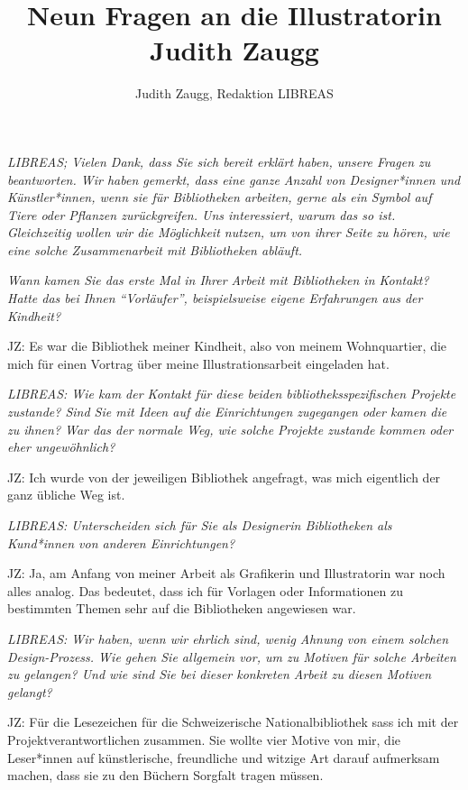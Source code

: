 \documentclass[a4paper,
fontsize=11pt,
oneside,
numbers=noperiodatend,
parskip=half-,
bibliography=totoc,
final
]{scrartcl}
\title{\LARGE{Neun Fragen an die Illustratorin Judith Zaugg}}%
\author{Judith Zaugg, Redaktion LIBREAS} %
\date{}
\begin{document}
\maketitle
\thispagestyle{fancyplain} 


\emph{LIBREAS; Vielen Dank, dass Sie sich bereit erklärt haben, unsere
Fragen zu beantworten. Wir haben gemerkt, dass eine ganze Anzahl von
Designer*innen und Künstler*innen, wenn sie für Bibliotheken arbeiten,
gerne als ein Symbol auf Tiere oder Pflanzen zurückgreifen. Uns
interessiert, warum das so ist. Gleichzeitig wollen wir die Möglichkeit
nutzen, um von ihrer Seite zu hören, wie eine solche Zusammenarbeit mit
Bibliotheken abläuft.}

\emph{Wann kamen Sie das erste Mal in Ihrer Arbeit mit Bibliotheken in
Kontakt? Hatte das bei Ihnen \enquote{Vorläufer}, beispielsweise eigene
Erfahrungen aus der Kindheit?}

JZ: Es war die Bibliothek meiner Kindheit, also von meinem Wohnquartier,
die mich für einen Vortrag über meine Illustrationsarbeit eingeladen
hat.

\emph{LIBREAS: Wie kam der Kontakt für diese beiden
bibliotheksspezifischen Projekte zustande? Sind Sie mit Ideen auf die
Einrichtungen zugegangen oder kamen die zu ihnen? War das der normale
Weg, wie solche Projekte zustande kommen oder eher ungewöhnlich?}

JZ: Ich wurde von der jeweiligen Bibliothek angefragt, was mich
eigentlich der ganz übliche Weg ist.

\emph{LIBREAS: Unterscheiden sich für Sie als Designerin Bibliotheken
als Kund*innen von anderen Einrichtungen?}

JZ: Ja, am Anfang von meiner Arbeit als Grafikerin und Illustratorin war
noch alles analog. Das bedeutet, dass ich für Vorlagen oder
Informationen zu bestimmten Themen sehr auf die Bibliotheken angewiesen
war.

\emph{LIBREAS: Wir haben, wenn wir ehrlich sind, wenig Ahnung von einem
solchen Design-Prozess. Wie gehen Sie allgemein vor, um zu Motiven für
solche Arbeiten zu gelangen? Und wie sind Sie bei dieser konkreten
Arbeit zu diesen Motiven gelangt?}

JZ: Für die Lesezeichen für die Schweizerische Nationalbibliothek sass
ich mit der Projektverantwortlichen zusammen. Sie wollte vier Motive von
mir, die Leser*innen auf künstlerische, freundliche und witzige Art
darauf aufmerksam machen, dass sie zu den Büchern Sorgfalt tragen
müssen.
\end{document}
